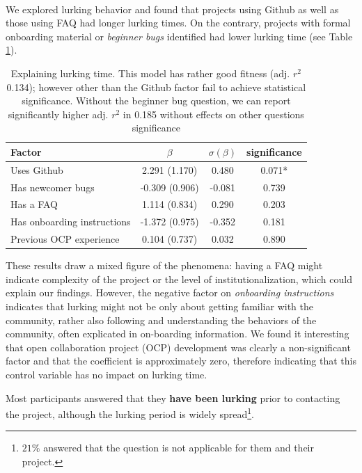 \\
We explored lurking behavior and found that projects using Github as well as those using FAQ had longer lurking times. On the contrary, projects with formal onboarding material or {\it beginner bugs} identified had lower lurking time (see Table \ref{tab:lurking_time_regression}).

\begin{table}
\centering
\begin{tabular}{lccc}
Factor & $\beta$ & $\sigma(\beta)$ & significance \\
\hline 
Uses Github & 2.291 (1.170) & 0.480 & 0.071* \\ 
Has newcomer bugs & -0.309 (0.906) & -0.081 & 0.739 \\ 
Has a FAQ & 1.114 (0.834) & 0.290 & 0.203 \\ 
Has onboarding instructions & -1.372 (0.975) & -0.352 & 0.181 \\
\hline
Previous OCP experience & 0.104 (0.737) & 0.032 & 0.890 \\ 
\hline 
\end{tabular} 
\caption{Explaining lurking time. This model has rather good fitness (adj. $r^2$ 0.134); however other than the Github factor fail to achieve statistical significance. Without the beginner bug question, we can report significantly higher adj. $r^2$ in 0.185 without effects on other questions significance}
\label{tab:lurking_time_regression}
\end{table}

These results draw a mixed figure of the phenomena: having a FAQ might indicate complexity of the project or the level of institutionalization, which could explain our findings. However, the negative factor on {\it onboarding instructions} indicates that lurking might not be only about getting familiar with the community, rather also following and understanding the behaviors of the community, often explicated in on-boarding information.  We found it interesting that open collaboration project (OCP) development was clearly a non-significant factor and that the coefficient is approximately zero, therefore indicating that this control variable has no impact on lurking time.

Most participants answered that they {\bf have been lurking} prior to contacting the project, although the lurking period is widely spread\footnote{$21\%$ answered that the question is not applicable for them and their project.}.  


